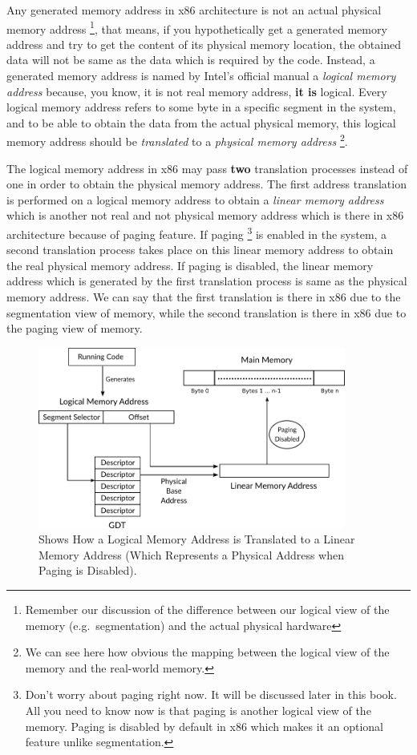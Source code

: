 Any generated memory address in x86 architecture is not an actual
physical memory address \footnote{Remember our discussion of the
  difference between our logical view of the memory (e.g.~segmentation)
  and the actual physical hardware}, that means, if you hypothetically
get a generated memory address and try to get the content of its
physical memory location, the obtained data will not be same as the data
which is required by the code. Instead, a generated memory address is
named by Intel's official manual a \emph{logical memory address}
because, you know, it is not real memory address, \textbf{it is}
logical. Every logical memory address refers to some byte in a specific
segment in the system, and to be able to obtain the data from the actual
physical memory, this logical memory address should be \emph{translated}
to a \emph{physical memory address} \footnote{We can see here how
  obvious the mapping between the logical view of the memory and the
  real-world memory.}.

The logical memory address in x86 may pass \textbf{two} translation
processes instead of one in order to obtain the physical memory address.
The first address translation is performed on a logical memory address
to obtain a \emph{linear memory address} which is another not real and
not physical memory address which is there in x86 architecture because
of paging feature. If paging \footnote{Don't worry about paging right
  now. It will be discussed later in this book. All you need to know now
  is that paging is another logical view of the memory. Paging is
  disabled by default in x86 which makes it an optional feature unlike
  segmentation.} is enabled in the system, a second translation process
takes place on this linear memory address to obtain the real physical
memory address. If paging is disabled, the linear memory address which
is generated by the first translation process is same as the physical
memory address. We can say that the first translation is there in x86
due to the segmentation view of memory, while the second translation is
there in x86 due to the paging view of memory.

\begin{figure}
\centering
\includegraphics[width=0.90000\textwidth]{Figures/x86-ch/logical-memory-address-translation.png}
\caption{Shows How a Logical Memory Address is Translated to a Linear
Memory Address (Which Represents a Physical Address when Paging is
Disabled).}\label{fig:logical_memory_address_translation}
\end{figure}

